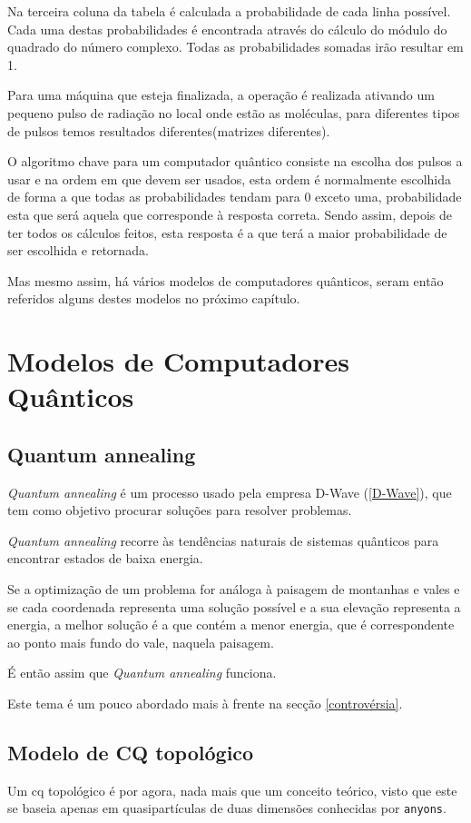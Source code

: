 \documentclass{report}
\begin{document}
	Na terceira coluna da tabela é calculada a probabilidade de cada linha possível. 			Cada uma destas probabilidades é encontrada através do cálculo do módulo do quadrado do número complexo.
	Todas as probabilidades somadas irão resultar em 1.

	Para uma máquina que esteja finalizada, a operação é realizada ativando um pequeno pulso de radiação no local onde estão as moléculas, para diferentes tipos de pulsos temos resultados diferentes(matrizes diferentes).

	O algoritmo chave para um computador quântico consiste na escolha dos pulsos a usar e na ordem em que devem ser usados, esta ordem é normalmente escolhida de forma a que todas as probabilidades tendam para 0 exceto uma, probabilidade esta que será aquela que corresponde à resposta correta. Sendo assim, depois de ter todos os cálculos feitos, esta resposta é a que terá a maior probabilidade de ser escolhida e retornada.

	Mas mesmo assim, há vários modelos de computadores quânticos, seram então referidos alguns destes modelos no próximo capítulo.

\chapter{Modelos de Computadores Quânticos}
\label{Modelos}

\section{Quantum annealing}
\label{Quantum-annealing}

	\emph{Quantum annealing} é um processo usado pela empresa D-Wave (\ref{D-Wave}), que tem como objetivo procurar soluções para resolver problemas.

	\emph{Quantum annealing} recorre  às tendências naturais de sistemas quânticos para encontrar estados de baixa energia.

	 Se a optimização de um problema for análoga à paisagem de montanhas e vales e  se cada coordenada representa uma solução possível e a sua elevação representa a energia, a melhor solução é a que contém a menor energia, que é correspondente ao ponto mais fundo do vale, naquela paisagem.
 
	É então assim que \emph{Quantum annealing} funciona.

	Este tema é um pouco abordado mais à frente na secção \ref{controvérsia}.

\section{Modelo de CQ topológico}
\label{Topológico}
	Um \ac{cq} topológico é por agora, nada mais que um conceito teórico, visto que este se baseia apenas em quasipartículas de duas dimensões conhecidas por \verb|anyons|.
\end{document}
